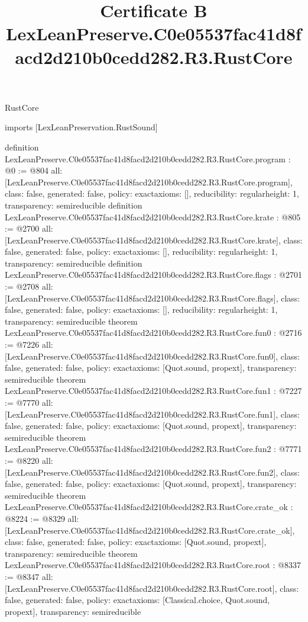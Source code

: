 \begin{lexlean}{RustCore}
\title{Certificate B LexLeanPreserve.C0e05537fac41d8facd2d210b0cedd282.R3.RustCore}
\begin{coremodule}
imports [LexLeanPreservation.RustSound]

definition LexLeanPreserve.C0e05537fac41d8facd2d210b0cedd282.R3.RustCore.program : @0 := @804 {
  all: [LexLeanPreserve.C0e05537fac41d8facd2d210b0cedd282.R3.RustCore.program],
  class: false,
  generated: false,
  policy: exact{axioms: []},
  reducibility: regular{height: 1},
  transparency: semireducible
}
definition LexLeanPreserve.C0e05537fac41d8facd2d210b0cedd282.R3.RustCore.krate : @805 := @2700 {
  all: [LexLeanPreserve.C0e05537fac41d8facd2d210b0cedd282.R3.RustCore.krate],
  class: false,
  generated: false,
  policy: exact{axioms: []},
  reducibility: regular{height: 1},
  transparency: semireducible
}
definition LexLeanPreserve.C0e05537fac41d8facd2d210b0cedd282.R3.RustCore.flags : @2701 := @2708 {
  all: [LexLeanPreserve.C0e05537fac41d8facd2d210b0cedd282.R3.RustCore.flags],
  class: false,
  generated: false,
  policy: exact{axioms: []},
  reducibility: regular{height: 1},
  transparency: semireducible
}
theorem LexLeanPreserve.C0e05537fac41d8facd2d210b0cedd282.R3.RustCore.fun0 : @2716 := @7226 {
  all: [LexLeanPreserve.C0e05537fac41d8facd2d210b0cedd282.R3.RustCore.fun0],
  class: false,
  generated: false,
  policy: exact{axioms: [Quot.sound, propext]},
  transparency: semireducible
}
theorem LexLeanPreserve.C0e05537fac41d8facd2d210b0cedd282.R3.RustCore.fun1 : @7227 := @7770 {
  all: [LexLeanPreserve.C0e05537fac41d8facd2d210b0cedd282.R3.RustCore.fun1],
  class: false,
  generated: false,
  policy: exact{axioms: [Quot.sound, propext]},
  transparency: semireducible
}
theorem LexLeanPreserve.C0e05537fac41d8facd2d210b0cedd282.R3.RustCore.fun2 : @7771 := @8220 {
  all: [LexLeanPreserve.C0e05537fac41d8facd2d210b0cedd282.R3.RustCore.fun2],
  class: false,
  generated: false,
  policy: exact{axioms: [Quot.sound, propext]},
  transparency: semireducible
}
theorem LexLeanPreserve.C0e05537fac41d8facd2d210b0cedd282.R3.RustCore.crate_ok : @8224 := @8329 {
  all: [LexLeanPreserve.C0e05537fac41d8facd2d210b0cedd282.R3.RustCore.crate_ok],
  class: false,
  generated: false,
  policy: exact{axioms: [Quot.sound, propext]},
  transparency: semireducible
}
theorem LexLeanPreserve.C0e05537fac41d8facd2d210b0cedd282.R3.RustCore.root : @8337 := @8347 {
  all: [LexLeanPreserve.C0e05537fac41d8facd2d210b0cedd282.R3.RustCore.root],
  class: false,
  generated: false,
  policy: exact{axioms: [Classical.choice, Quot.sound, propext]},
  transparency: semireducible
}


\end{coremodule}
\end{lexlean}
